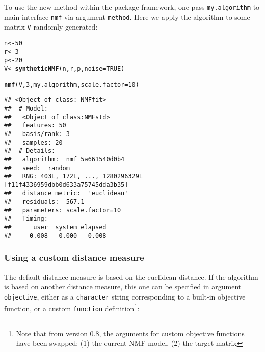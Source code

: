 \documentclass[a4paper]{article}\usepackage{graphicx, color}
\makeatletter
\newcommand{\hlfunctioncall}[1]{\textcolor[rgb]{0.501960784313725,0,0.329411764705882}{\textbf{#1}}}%
\newenvironment{kframe}{%
 \def\at@end@of@kframe{}%
 \ifinner\ifhmode%
  \def\at@end@of@kframe{\end{minipage}}%
  \begin{minipage}{\columnwidth}%
 \fi\fi%
 \def\FrameCommand##1{\hskip\@totalleftmargin \hskip-\fboxsep
 \colorbox{shadecolor}{##1}\hskip-\fboxsep
     \hskip-\linewidth \hskip-\@totalleftmargin \hskip\columnwidth}%
 \MakeFramed {\advance\hsize-\width
   \@totalleftmargin\z@ \linewidth\hsize
   \@setminipage}}%
 {\par\unskip\endMakeFramed%
 \at@end@of@kframe}
\newenvironment{knitrout}{}{} %
\let\code=\texttt
\makeatother
\begin{document}
To use the new method within the package framework, one pass \code{my.algorithm} to main interface \code{nmf} via argument \code{method}. 
Here we apply the algorithm to some matrix \code{V} randomly generated: 

\begin{knitrout}
\color{fgcolor}\begin{kframe}
\begin{alltt}
n <- 50
r <- 3
p <- 20
V <- \hlfunctioncall{syntheticNMF}(n, r, p, noise = TRUE)
\end{alltt}
\end{kframe}
\end{knitrout}


\begin{knitrout}
\color{fgcolor}\begin{kframe}
\begin{alltt}
\hlfunctioncall{nmf}(V, 3, my.algorithm, scale.factor = 10)
\end{alltt}
\begin{verbatim}
## <Object of class: NMFfit>
##  # Model:
##   <Object of class:NMFstd>
##   features: 50 
##   basis/rank: 3 
##   samples: 20 
##  # Details:
##   algorithm:  nmf_5a661540d0b4 
##   seed:  random 
##   RNG: 403L, 172L, ..., 1280296329L [f11f4336959dbb0d633a75745dda3b35]
##   distance metric:  'euclidean' 
##   residuals:  567.1 
##   parameters: scale.factor=10 
##   Timing:
##      user  system elapsed 
##     0.008   0.000   0.008
\end{verbatim}
\end{kframe}
\end{knitrout}


\subsubsection{Using a custom distance measure}
The default distance measure is based on the euclidean distance. 
If the algorithm is based on another distance measure, this one can be specified in argument \code{objective}, either as a \code{character} string corresponding to a built-in objective function, or a custom \code{function} definition\footnote{Note that from version 0.8, the arguments for custom objective functions have been swapped: (1) the current NMF model, (2) the target matrix}:
\end{document}
